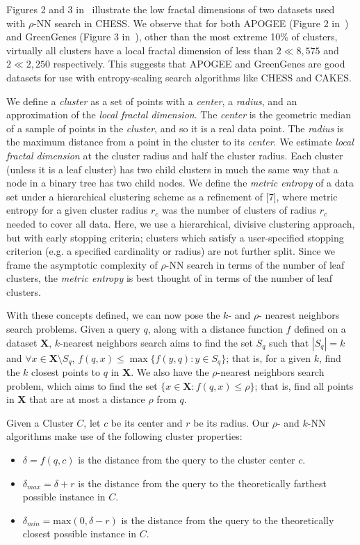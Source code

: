 Figures 2 and 3 in~\cite{ishaq2019clustered} illustrate the low fractal dimensions of two datasets used with $\rho$-NN search in CHESS. 
We observe that for both APOGEE (Figure 2 in~\cite{ishaq2019clustered}) and GreenGenes (Figure 3 in~\cite{ishaq2019clustered}), other than the most extreme 10\% of clusters, virtually all clusters have a local fractal dimension of less than $2 \ll 8,575$
and $2 \ll 2,250$ respectively.
This suggests that APOGEE and GreenGenes are good datasets for use with entropy-scaling search algorithms like CHESS and CAKES.

We define a \emph{cluster} as a set of points with a \emph{center}, a \emph{radius}, and an approximation of the \emph{local fractal dimension}.
The \emph{center} is the geometric median of a sample of points in the \emph{cluster}, and so it is a real data point. The \emph{radius} is the
maximum distance from a point in the cluster to its \emph{center}. We estimate \emph{local fractal dimension} at the cluster radius and half
the cluster radius. Each cluster (unless it is a leaf cluster) has two child clusters in much the same way that a node in
a binary tree has two child nodes. We define the \emph{metric entropy} of a data set under a hierarchical clustering scheme as a refinement of [7], where
metric entropy for a given cluster radius $r_c$ was the number of clusters of radius $r_c$ needed to cover all data. Here, we use a hierarchical, divisive clustering 
approach, but with early stopping criteria; clusters which satisfy a user-specified stopping criterion (e.g. a specified cardinality or radius) are not further split. 
Since we frame the asymptotic complexity of $\rho$-NN search in terms of the number of leaf clusters, the \emph{metric entropy} is best thought of in terms of the number of
leaf clusters. 


With these concepts defined, we can now pose the $k$- and $\rho$- nearest neighbors search problems.
Given a query $q$, along with a distance function $f$ defined on a dataset $\textbf{X}$, $k$-nearest neighbors search aims to find 
the set $S_q$ such that  $|S_q| = k$ and $\forall x \in \textbf{X} \setminus S_q$, $f(q, x) \leq \max\{f(y, q): y \in S_q \}$; that is,
for a given $k$, find the $k$ closest points to $q$ in $ \textbf{X}$.
We also have the $\rho$-nearest neighbors search problem, which aims to find the set $\{x \in \textbf{X}: f(q, x) \leq \rho \}$; that is, 
find all points in $\textbf{X}$ that are at most a distance $\rho$ from $q$.

Given a Cluster $C$, let $c$ be its center and $r$ be its radius. Our $\rho$- and $k$-NN algorithms make use of the following cluster 
properties:
\begin{itemize}
    \item $\delta = f(q, c)$ is the distance from the query to the cluster center $c$.
    \item $\delta_{max} = \delta + r$ is the distance from the query to the theoretically farthest possible instance in $C$.
    \item $\delta_{min} = \text{max}(0, \delta - r)$ is the distance from the query to the theoretically closest possible instance in $C$.
\end{itemize}



